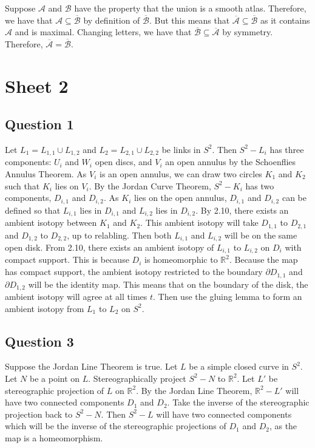 \documentclass{article}
\theoremstyle{definition}
\numberwithin{theorem}{section}
\numberwithin{equation}{section}
\begin{document}
Suppose $\mathcal{A}$ and $\mathcal{B}$ have the property that the union is a smooth atlas. Therefore, we have that $\mathcal{A} \subseteq \overline{\mathcal{B}}$ by definition of $\overline{\mathcal{B}}$. But this means that $\overline{\mathcal{A}} \subseteq \overline{\mathcal{B}}$ as it contains $\mathcal{A}$ and is maximal. Changing letters, we have that $\overline{\mathcal{B}} \subseteq \overline{\mathcal{A}}$ by symmetry. Therefore, $\overline{\mathcal{A}} = \overline{\mathcal{B}}$.

\section{Sheet 2}

\subsection{Question 1}
Let $L_1 = L_{1,1} \cup L_{1,2}$ and $L_2 = L_{2,1} \cup L_{2,2}$ be links in $S^2$. Then $S^2 - L_i$ has three components: $U_i$ and $W_i$ open discs, and $V_i$ an open annulus by the Schoenflies Annulus Theorem. As $V_i$ is an open annulus, we can draw two circles $K_1$ and $K_2$ such that $K_i$ lies on $V_i$. By the Jordan Curve Theorem, $S^2 - K_i$ has two components, $D_{i, 1}$ and $D_{i, 2}$. As $K_i$ lies on the open annulus, $D_{i, 1}$ and $D_{i, 2}$ can be defined so that $L_{i, 1}$ lies in $D_{i, 1}$ and $L_{i, 2}$ lies in $D_{i, 2}$.
By 2.10, there exists an ambient isotopy between $K_1$ and $K_2$. This ambient isotopy will take $D_{1,1}$ to $D_{2,1}$ and $D_{1,2}$ to $D_{2,2}$, up to relabling. Then both $L_{i,1}$ and $L_{i,2}$ will be on the same open disk. From 2.10, there exists an ambient isotopy of $L_{i, 1}$ to $L_{i, 2}$ on $D_i$ with compact support. This is because $D_i$ is homeomorphic to $\mathbb{R}^2$. Because the map has compact support, the ambient isotopy restricted to the boundary $\partial D_{1,1}$ and $\partial D_{1,2}$ will be the identity map. This means that on the boundary of the disk, the ambient isotopy will agree at all times $t$. Then use the gluing lemma to form an ambient isotopy from $L_1$ to $L_2$ on $S^2$. 

\subsection{Question 3}
Suppose the Jordan Line Theorem is true. Let $L$ be a simple closed curve in $S^2$. Let $N$ be a point on $L$. Stereographically project $S^2 - N$ to $\mathbb{R}^2$. Let $L'$ be stereographic projection of $L$ on $\mathbb{R}^2$. By the Jordan Line Theorem, $\mathbb{R}^2 - L'$ will have two connected components $D_1$ and $D_2$. Take the inverse of the stereographic projection back to $S^2 - N$. Then $S^2 - L$ will have two connected components which will be the inverse of the stereographic projections of $D_1$ and $D_2$, as the map is a homeomorphism. 
\end{document}
